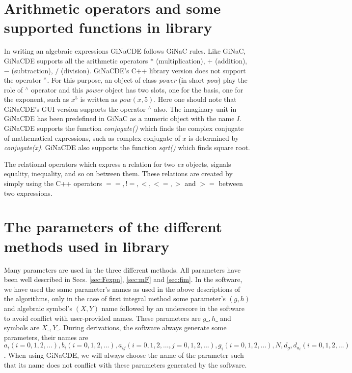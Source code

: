 \documentclass[prd,aps,floats,showkeys,nofootinbib,notitlepage]{revtex4}
\begin{document}
	\section{Arithmetic operators and some supported functions in library}
	In writing an algebraic expressions GiNaCDE follows GiNaC rules. Like GiNaC, GiNaCDE supports all the arithmetic operators $*$ (multiplication), $+$ (addition), $-$ (subtraction), $/$ (division). GiNaCDE's C++ library version does not support the operator $ ^{\wedge}$. For this purpose, an object of class {\em power} (in short {\em pow}) play the role of $ ^{\wedge}$ operator and this {\em power} object has two slots, one for the basis, one for the exponent, such as $x^5$ is written as $pow(x,5)$. Here one should note that GiNaCDE's GUI version supports the operator $ ^{\wedge}$ also.
	The imaginary unit in GiNaCDE has been predefined in GiNaC as a numeric object with the name $I$. GiNaCDE supports the function {\em conjugate()} which finds the complex conjugate of mathematical expressions, such as complex conjugate of $x$ is determined by {\em conjugate(x)}. GiNaCDE also supports the function {\em sqrt()} which finds square root.  
	\par The relational operators which express a relation for two {\em ex} objects, signals equality, inequality, and so on between them. These relations are created by simply using the C++ operators $==, !=, <, <=, >$ and $>=$ between two expressions. 
	
	\section{The parameters of the different methods used in library}
	Many parameters are used in the three different methods. All parameters have been well described in Secs. \ref{sec:Fexpn}, \ref{sec:mF} and \ref{sec:fim}. In the software, we have used the same parameter's names as used in the above descriptions of the algorithms, only in the case of first integral method some parameter's $(g,h)$ and algebraic symbol's $(X,Y)$ name followed by an underscore in the software to avoid conflict with user-provided names. These parameters are $g\_,h\_$ and symbols are $X\_,Y\_$. During derivations, the software always generate some parameters, their names are $a_i(i=0,1,2,\ldots),b_i(i=0,1,2,\ldots),a_{ij}(i=0,1,2,\ldots,j=0,1,2,\ldots),g_i(i=0,1,2,\ldots),N,d_g,d_{a_i}(i=0,1,2,\ldots)$. When using GiNaCDE, we will always choose the name of the parameter such that its name does not conflict with these parameters generated by the software.
	
\end{document}
